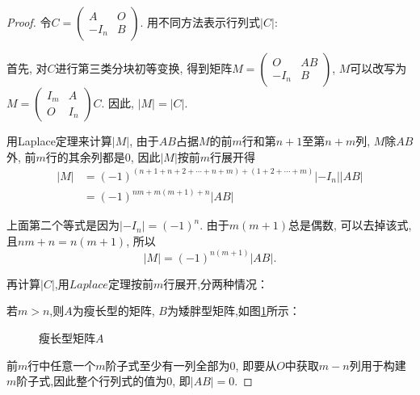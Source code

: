 \begin{proof}
  令$C=\left(\begin{smallmatrix}
      A & O\\
      -I_n & B \end{smallmatrix}\right)$.
  用不同方法表示行列式$|C|$:

  首先, 对$C$进行第三类分块初等变换, 得到矩阵$M=\left(\begin{smallmatrix}
      O & AB\\
      -I_n & B \end{smallmatrix}\right)$, $M$可以改写为
  $M = \left(\begin{smallmatrix}
      I_m & A\\
      O & I_n \end{smallmatrix}\right)C$. 
  因此, $|M| = |C|$. 

  用Laplace定理来计算$\left\vert M \right\vert$, 
  由于$AB$占据$M$的前$m$行和第$n+1$至第$n+m$列, 
  $M$除$AB$外, 前$m$行的其余列都是$0$, 因此$|M|$按前$m$行展开得
  \begin{align*}
    |M| & =(-1)^{(n+1+n+2+\cdots+n+m)+(1+2+\cdots+m)}|-I_n||AB|\\
        & =(-1)^{nm+m(m+1)+n}|AB|
  \end{align*}
  
  上面第二个等式是因为$|-I_n|=(-1)^n$. 
  由于$m(m+1)$总是偶数, 可以去掉该式, 且$nm+n=n(m+1)$, 所以
  \begin{equation}\label{eq:Matrix2}
    |M|=(-1)^{n(m+1)}|AB|.
  \end{equation}  

  再计算$|C|$,用$Laplace$定理按前$m$行展开,分两种情况：

  若$m > n$,则$A$为瘦长型的矩阵, $B$为矮胖型矩阵,如图\ref{fig:Matrix1}所示：\\
  \begin{figure}[!ht]
   \begin{center}
  \end{center}
  \caption{瘦长型矩阵$A$\label{fig:Matrix1}}
\end{figure}  前$m$行中任意一个$m$阶子式至少有一列全部为$0$,
即要从$O$中获取$m-n$列用于构建$m$阶子式,因此整个行列式的值为$0$,
即$|AB|=0$.


\end{proof}
